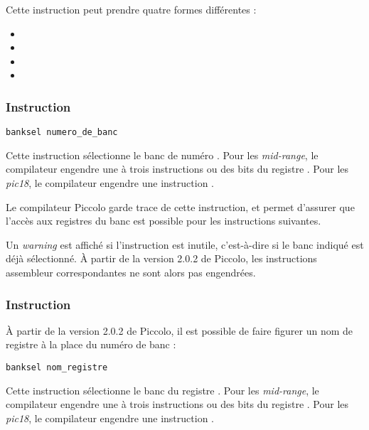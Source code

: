 Cette instruction peut prendre quatre formes différentes :
\begin{itemize}
  \item {}
  \item {}
  \item {}
  \item {}
\end{itemize}


\subsubsection{Instruction }
\begin{lstlisting}[language=piccolo]
banksel numero_de_banc
\end{lstlisting}

Cette instruction sélectionne le banc de numéro . Pour les \emph{mid-range}, le compilateur engendre une à trois instructions  ou  des bits  du registre . Pour les \emph{pic18}, le compilateur engendre une instruction .

Le compilateur Piccolo garde trace de cette instruction, et permet d'assurer que l'accès aux registres du banc  est possible pour les instructions suivantes.

Un \emph{warning} est affiché si l'instruction est inutile, c'est-à-dire si le banc indiqué est déjà sélectionné. À partir de la version 2.0.2 de Piccolo, les instructions assembleur correspondantes ne sont alors pas engendrées.






\subsubsection{Instruction }
À partir de la version 2.0.2 de Piccolo, il est possible de faire figurer un nom de registre à la place du numéro de banc :
\begin{lstlisting}[language=piccolo]
banksel nom_registre
\end{lstlisting}

Cette instruction sélectionne le banc du registre . Pour les \emph{mid-range}, le compilateur engendre une à trois instructions  ou  des bits  du registre . Pour les \emph{pic18}, le compilateur engendre une instruction .


